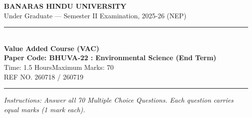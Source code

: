 \documentclass[11pt,a4paper]{article}
\begin{document}
\begin{center}
  {\large\bfseries BANARAS HINDU UNIVERSITY}\\[2pt]
  {\normalsize Under Graduate --- Semester II Examination, 2025-26 (NEP)}\\[6pt]
  \rule{0.8\linewidth}{0.5pt}\\[6pt]
  {\large\bfseries Value Added Course (VAC)}\\[4pt]
  {\large\bfseries Paper Code: BHUVA-22 : Environmental Science (End Term)}\\[4pt]
  {\normalsize Time: 1.5 Hours\hfill Maximum Marks: 70}\\[2pt]
  {\small REF NO. 260718 / 260719}
\end{center}

\rule{\linewidth}{0.4pt}

\smallskip



\noindent   \textit{Instructions: Answer all 70 Multiple Choice Questions. Each question carries equal marks (1 mark each).}

\bigskip
\end{document}
